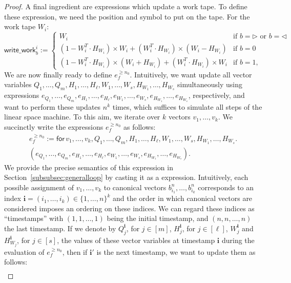 \begin{proof}
    A final ingredient are expressions which update a work tape.
    To define these expression, we need the position and symbol to put on the tape. For the work tape $W_i$:
    $$
    \mathsf{write\_work}_b^i:=\begin{cases}
    W_i  & \text{if $b=\rhd$ or $b=\lhd$}\\
    (1-W_i^T\cdot H_{W_i})\times W_i + (W_i^T\cdot H_{W_i})\times (W_i-H_{W_i}) &\text{if $b=0$}\\
    (1-W_i^T\cdot H_{W_i})\times (W_i+H_{W_i}) + (W_i^T\cdot H_{W_i})\times W_i &\text{if $b=1$},
    \end{cases}
    $$
    We are now finally ready to define $e_f^{\geq n_0}$. Intuitively, we want update all vector variables
	$Q_1,\ldots,\allowbreak Q_m,\allowbreak H_1,\ldots,H_\ell,W_1,\ldots,W_s, H_{W_1},\ldots,H_{W_s}$
	simultaneously using expressions $e_{Q_1},\ldots,e_{Q_m},\allowbreak e_{H_1},\allowbreak\ldots,\allowbreak e_{H_\ell},\allowbreak e_{W_1},\ldots,e_{W_s},e_{H_{W_1}},\ldots,e_{H_{W_s}}$, respectively, and want to perform these updates $n^k$ times,
	which suffices to simulate all steps of the linear space machine. To this aim, we iterate over $k$ vectors $v_1,\ldots, v_k$.
	We succinctly write the expressions  $e_f^{\geq n_0}$ as follows:
    \begin{multline*}
    e_f^{\geq n_0}:= \mathsf{for\,} v_1,\ldots,v_{k},Q_1,\ldots,Q_m,H_1,\ldots,H_\ell,W_1,\ldots,W_s, H_{W_1},\ldots,H_{W_s}. \\
    (e_{Q_1},\ldots,e_{Q_m},e_{H_1},\ldots,e_{H_\ell},e_{W_1},\ldots,e_{W_s},e_{H_{W_1}},\ldots,e_{H_{W_s}}).
    \end{multline*}
	We provide the precise semantics of this expression in Section~\ref{subsubsec:generalloop} by casting it as a \langfor expression.
	Intuitively, each possible assignment of $v_1,\ldots,v_k$ to canonical vectors $b_{i_1}^n,\ldots, b_{i_k}^n$ corresponds to an index $\mathbf{i}=(i_1,\ldots,i_k)\in\{1,\ldots,n\}^k$
	and the order in which canonical vectors are considered imposes an ordering on these indices. We can regard these indices as ``timestamps''
	with $(1,1,\ldots,1)$ being the initial timestamp, and $(n,n,\ldots,n)$ the last timestamp.
		If we denote by $Q_j^{\mathbf{i}}$, for $j\in[m]$, $H_j^{\mathbf{i}}$, for $j\in[\ell]$, $W_j^{\mathbf{i}}$ and $H_{W_j}^{\mathbf{i}}$, for $j\in[s]$, the values of these vector variables at timestamp $\mathbf{i}$ during the evaluation of $e_f^{\geq n_0}$, then if $\mathbf{i}'$ is the next timestamp, we want to update them as follows:
	\begin{align*}

\end{align*}
\end{proof}

